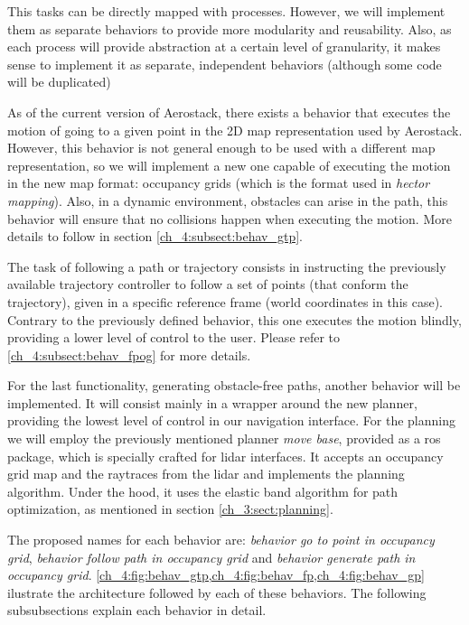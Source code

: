   This tasks can be directly mapped with processes. However, we will implement them as separate behaviors to provide more modularity and reusability. Also, as each process will provide abstraction at a certain level of granularity, it makes sense to implement it as separate, independent behaviors (although some code will be duplicated)

  As of the current version of Aerostack, there exists a behavior that executes the motion of going to a given point in the 2D map representation used by Aerostack. However, this behavior is not general enough to be used with a different map representation, so we will implement a new one capable of executing the motion in the new map format: occupancy grids (which is the format used in \textit{hector mapping}). Also, in a dynamic environment, obstacles can arise in the path, this behavior will ensure that no collisions happen when executing the motion. More details to follow in section \ref{ch_4:subsect:behav_gtp}.

  The task of following a path or trajectory consists in instructing the previously available trajectory controller to follow a set of points (that conform the trajectory), given in a specific reference frame (world coordinates in this case). Contrary to the previously defined behavior, this one executes the motion blindly, providing a lower level of control to the user. Please refer to \ref{ch_4:subsect:behav_fpog} for more details.

  For the last functionality, generating obstacle-free paths, another behavior will be implemented. It will consist mainly in a wrapper around the new planner, providing the lowest level of control in our navigation interface. For the planning we will employ the previously mentioned planner \textit{move base}, provided as a ros package, which is specially crafted for lidar interfaces. It accepts an occupancy grid map and the raytraces from the lidar and implements the planning algorithm. Under the hood, it uses the elastic band algorithm for path optimization, as mentioned in section \ref{ch_3:sect:planning}.

  The proposed names for each behavior are: \textit{behavior go to point in occupancy grid}, \textit{behavior follow path in occupancy grid} and \textit{behavior generate path in occupancy grid}. \cref{ch_4:fig:behav_gtp,ch_4:fig:behav_fp,ch_4:fig:behav_gp} ilustrate the architecture followed by each of these behaviors. The following subsubsections explain each behavior in detail.

